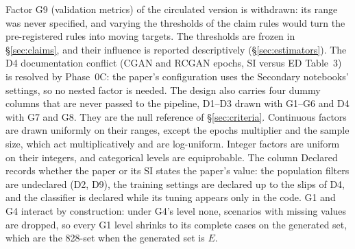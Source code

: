 \documentclass[11pt,a4paper]{article}
\begin{document}
\noindent Factor G9 (validation metrics) of the circulated version is
withdrawn: its range was never specified, and varying the thresholds of
the claim rules would turn the pre-registered rules into moving targets.
The thresholds are frozen in \S\ref{sec:claims}, and their influence is
reported descriptively (\S\ref{sec:estimators}). The D4
documentation conflict (CGAN and RCGAN epochs, SI versus ED Table~3) is
resolved by Phase~0C: the paper's configuration uses the Secondary
notebooks' settings, so no nested factor is needed. The design also
carries four dummy columns that are never passed to the pipeline, D1--D3
drawn with G1--G6 and D4 with G7 and G8. They are the null reference of
\S\ref{sec:criteria}. Continuous factors are drawn uniformly on
their ranges, except the epochs multiplier and the sample size, which act
multiplicatively and are log-uniform. Integer factors are uniform on their
integers, and categorical levels are equiprobable. The column Declared
records whether the paper or its SI states the paper's value: the
population filters are undeclared (D2, D9), the training settings are
declared up to the slips of D4, and the classifier is declared while its
tuning appears only in the code. G1 and G4 interact by construction: under
G4's level none, scenarios with missing values are dropped, so every G1
level shrinks to its complete cases on the generated set, which are the
828-set when the generated set is $E$.
\end{document}
